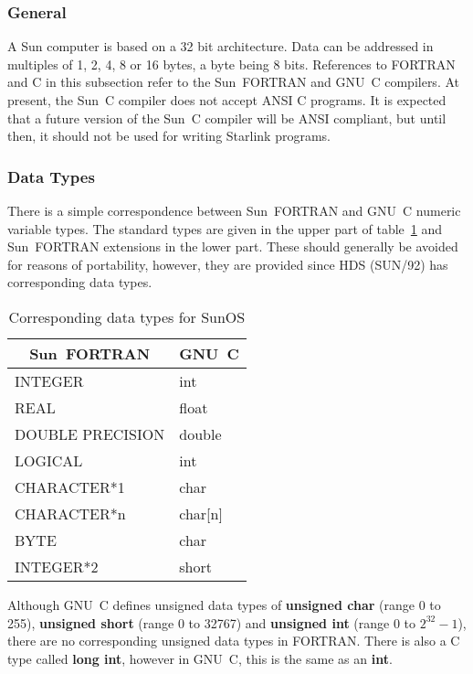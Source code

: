 \subsubsection{General}

A Sun computer is based on a 32 bit architecture. Data can be addressed in
multiples of 1, 2, 4, 8 or 16 bytes, a byte being 8 bits. References to FORTRAN
and C in this subsection refer to the Sun~FORTRAN and GNU~C compilers. At
present, the Sun~C compiler does not accept ANSI C programs. It is expected
that a future version of the Sun~C compiler will be ANSI compliant, but until
then, it should not be used for writing Starlink programs.

\subsubsection{Data Types}

There is a simple correspondence between Sun~FORTRAN and GNU~C numeric variable types.
The standard types are given in the upper part of table~\ref{sun:data-types}
and Sun~FORTRAN extensions in the lower part. These should generally be avoided
for reasons of portability, however, they are provided since HDS (SUN/92) has
corresponding data types.

\begin{table}[htb]
\begin{center}
\begin{tabular}{|l|l|} \hline
\multicolumn{1}{|c|}{Sun~FORTRAN} & \multicolumn{1}{c|}{GNU~C} \\ \hline
INTEGER & int \\
REAL & float \\
DOUBLE PRECISION & double \\
LOGICAL & int \\
CHARACTER*1 & char \\
CHARACTER*n & char[n] \\ \hline
BYTE & char \\
INTEGER*2 & short \\ \hline
\end{tabular}
\end{center}
\caption{Corresponding data types for SunOS}
\label{sun:data-types}
\end{table}

Although GNU~C defines unsigned data types of {\bf unsigned char} (range 0 to 255), 
{\bf unsigned short} (range 0 to 32767) and {\bf unsigned int} (range 0 to
$2^{32}-1$), there are no corresponding unsigned data types in FORTRAN. There
is also a C type called {\bf long int}, however in GNU~C, this is the same as
an {\bf int}.

